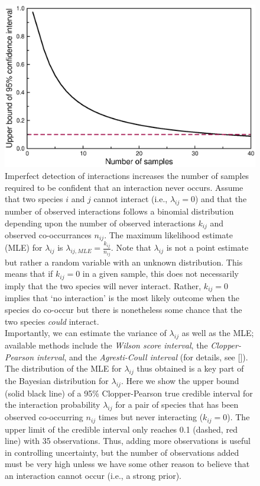 \documentclass[12pt]{article}
\begin{document}
        \begin{figure}[h!]
          \caption{Imperfect detection of interactions increases the number of samples required to be confident that an interaction never occurs. Assume that two species $i$ and $j$ cannot interact (i.e., $\lambda_{ij}=0$) and that the number of observed interactions follows a binomial distribution depending upon the number of observed interactions $k_{ij}$ and observed co-occurrances $n_{ij}$. The maximum likelihood estimate (MLE) for $\lambda_{ij}$ is $\lambda_{ij,MLE}=\frac{k_{ij}}{n_{ij}}$. Note that $\lambda_{ij}$ is not a point estimate but rather a random variable with an unknown distribution. This means that if $k_{ij}=0$ in a given sample, this does not necessarily imply that the two species will never interact. Rather, $k_{ij}=0$ implies that `no interaction' is the most likely outcome when the species do co-occur but there is nonetheless some chance that the two species \emph{could} interact.\\
          Importantly, we can estimate the variance of $\lambda_{ij}$ as well as the MLE; available methods include the \emph{Wilson score interval}, the \emph{Clopper-Pearson interval}, and the \emph{Agresti-Coull interval} (for details, see [\citealp{Brown2001}]). The distribution of the MLE for $\lambda_{ij}$ thus obtained is a key part of the Bayesian distribution for $\lambda_{ij}$.
          Here we show the upper bound (solid black line) of a 95\% Clopper-Pearson true credible interval for the interaction probability $\lambda_{ij}$ for a pair of species that has been observed co-occurring $n_{ij}$ times but never interacting ($k_{ij}=0$). The upper limit of the credible interval only reaches 0.1 (dashed, red line) with 35 observations. Thus, adding more observations is useful in controlling uncertainty, but the number of observations added must be very high unless we have some other reason to believe that an interaction cannot occur (i.e., a strong prior).}
          \label{upper_limits}
          \begin{center}
          \includegraphics*[width=.8\textwidth]{figures/upper_limit_DG.eps}
          \end{center}
          \end{figure}
\end{document}
